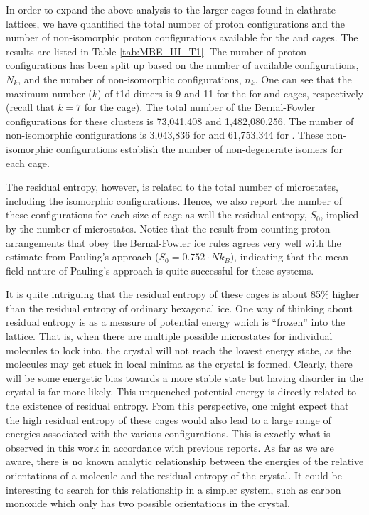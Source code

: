 \documentclass[11pt, proquest]{uwthesis}[2020/02/24]
\let\ce\ch
\begin{document}
\par In order to expand the above analysis to the larger cages found in clathrate lattices, we have quantified the total number of proton configurations and the number of non-isomorphic proton configurations available for the \ce{(H2O)_{24}} and \ce{(H2O)_{28}} cages. The results are listed in Table \ref{tab:MBE_III_T1}. The number of proton configurations has been split up based on the number of available configurations, $N_k$, and the number of non-isomorphic configurations, $n_k$. One can see that the maximum number ($k$) of t1d dimers is 9 and 11 for the for \ce{(H2O)_{24}} and \ce{(H2O)_{28}} cages, respectively (recall that $k=7$ for the \ce{(H2O)_{20}} cage). The total number of the Bernal-Fowler configurations for these clusters is 73,041,408 and 1,482,080,256. The number of non-isomorphic configurations is 3,043,836 for \ce{(H2O)_{24}} and 61,753,344 for \ce{(H2O)_{28}}. These non-isomorphic configurations establish the number of non-degenerate isomers for each cage.

\par The residual entropy, however, is related to the total number of microstates, including the isomorphic configurations. Hence, we also report the number of these configurations for each size of cage as well the residual entropy, $S_0$, implied by the number of microstates. Notice that the result from counting proton arrangements that obey the Bernal-Fowler ice rules agrees very well with the estimate from Pauling’s approach\autocite{pauling_structure_1935} ($S_0=0.752\cdot Nk_B$), indicating that the mean field nature of Pauling’s approach is quite successful for these systems.

\par It is quite intriguing that the residual entropy of these cages is about 85\% higher than the residual entropy of ordinary hexagonal ice. One way of thinking about residual entropy is as a measure of potential energy which is “frozen” into the lattice. That is, when there are multiple possible microstates for individual molecules to lock into, the crystal will not reach the lowest energy state, as the molecules may get stuck in local minima as the crystal is formed. Clearly, there will be some energetic bias towards a more stable state but having disorder in the crystal is far more likely. This unquenched potential energy is directly related to the existence of residual entropy. From this perspective, one might expect that the high residual entropy of these cages would also lead to a large range of energies associated with the various configurations. This is exactly what is observed in this work in accordance with previous reports.\autocite{tokmachev_hydrogen-bond_2010} As far as we are aware, there is no known analytic relationship between the energies of the relative orientations of a molecule and the residual entropy of the crystal. It could be interesting to search for this relationship in a simpler system, such as carbon monoxide which only has two possible orientations in the crystal.
\end{document}

